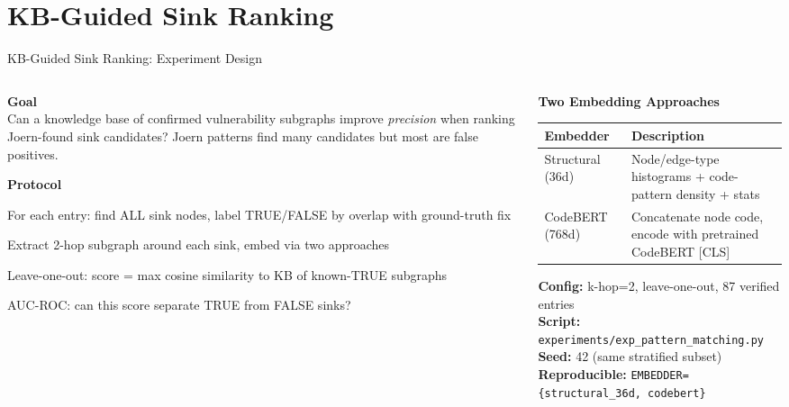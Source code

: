 \documentclass[aspectratio=169,10pt]{beamer}
\begin{document}
\section{KB-Guided Sink Ranking}

\begin{frame}{KB-Guided Sink Ranking: Experiment Design}
\begin{columns}[T]
\begin{column}{0.50\textwidth}

  \textbf{Goal}\\[3pt]
  {\small Can a knowledge base of confirmed vulnerability subgraphs
  improve \emph{precision} when ranking Joern-found sink candidates?
  Joern patterns find many candidates but most are false positives.}

  \vspace{0.5em}
  \textbf{Protocol}
  \begin{description}
    \item[\textbf{Label}] For each entry: find ALL sink nodes, label TRUE/FALSE by overlap with ground-truth fix
    \item[\textbf{Embed}] Extract 2-hop subgraph around each sink, embed via two approaches
    \item[\textbf{Rank}] Leave-one-out: score = max cosine similarity to KB of known-TRUE subgraphs
    \item[\textbf{Eval}] AUC-ROC: can this score separate TRUE from FALSE sinks?
  \end{description}

\end{column}
\begin{column}{0.47\textwidth}

  {\small\textbf{Two Embedding Approaches}}\\[4pt]
  {\scriptsize
  \renewcommand{\arraystretch}{1.25}
  \begin{tabular}{p{2.5cm}p{2.8cm}}
    \toprule
    \textbf{Embedder} & \textbf{Description} \\
    \midrule
    Structural (36d) & Node/edge-type histograms + code-pattern density + stats \\
    \midrule
    CodeBERT (768d) & Concatenate node code, encode with pretrained CodeBERT [CLS] \\
    \bottomrule
  \end{tabular}}

  \vspace{0.4em}
  {\scriptsize\textbf{Config:} k-hop=2, leave-one-out, 87 verified entries\\
  \textbf{Script:} \texttt{experiments/exp\_pattern\_matching.py}\\
  \textbf{Seed:} 42 (same stratified subset)\\
  \textbf{Reproducible:} \texttt{EMBEDDER=\{structural\_36d, codebert\}}}

\end{column}
\end{columns}
\end{frame}
\end{document}
